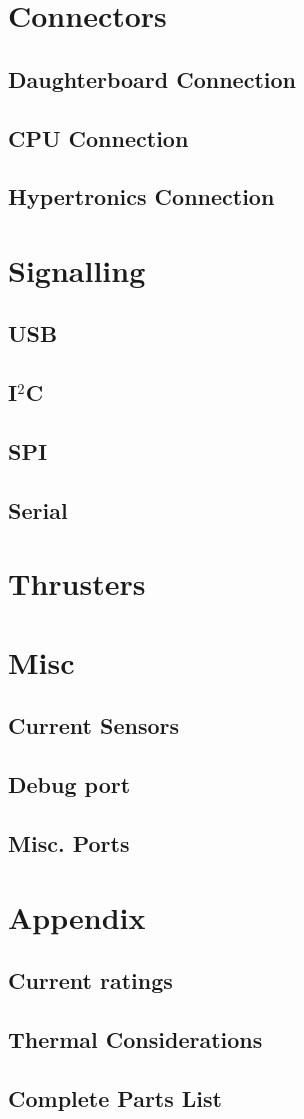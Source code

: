 \documentclass{article}
\begin{document}
\section{Connectors}
\subsection{Daughterboard Connection}
\subsection{CPU Connection}
\subsection{Hypertronics Connection}

\section{Signalling}
\subsection{USB}
\subsection{I$^2$C}
\subsection{SPI}
\subsection{Serial}

\section{Thrusters}

\section{Misc}
\subsection{Current Sensors}
\subsection{Debug port}
\subsection{Misc. Ports}

\section{Appendix}
\subsection{Current ratings}
\subsection{Thermal Considerations}
\subsection{Complete Parts List}
\end{document}
